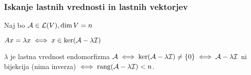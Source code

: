\subsubsection{Iskanje lastnih vrednosti in lastnih vektorjev}
Naj bo $\mathcal{A} \in \mathcal{L}(V), \dim V = n$

$Ax = \lambda x \iff x \in \ker (\mathcal{A} - \lambda \mathcal{I})$

$\lambda$ je lastna vrednost endomorfizma $\mathcal{A} \iff \ker (\mathcal{A} - \lambda \mathcal{I}) \neq \{0\} \iff \mathcal{A} - \lambda \mathcal{I}$ ni bijekcija (nima inverza) $\iff \operatorname{rang}(\mathcal{A} - \lambda \mathcal{I}) < n$.